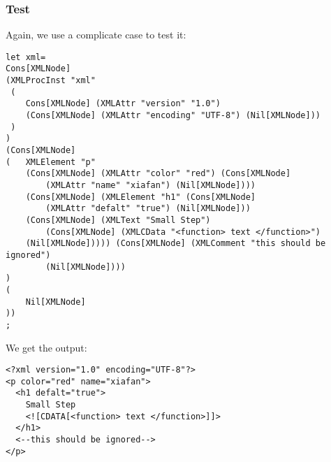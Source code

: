 \subsubsection{Test}
Again, we use a complicate case to test it:

\begin{lstlisting}
let xml=
Cons[XMLNode]
(XMLProcInst "xml"
 (
    Cons[XMLNode] (XMLAttr "version" "1.0")
    (Cons[XMLNode] (XMLAttr "encoding" "UTF-8") (Nil[XMLNode]))
 )
)
(Cons[XMLNode]
(   XMLElement "p"
    (Cons[XMLNode] (XMLAttr "color" "red") (Cons[XMLNode]
        (XMLAttr "name" "xiafan") (Nil[XMLNode])))
    (Cons[XMLNode] (XMLElement "h1" (Cons[XMLNode]
        (XMLAttr "defalt" "true") (Nil[XMLNode]))
    (Cons[XMLNode] (XMLText "Small Step")
        (Cons[XMLNode] (XMLCData "<function> text </function>")
    (Nil[XMLNode])))) (Cons[XMLNode] (XMLComment "this should be ignored")
        (Nil[XMLNode])))
)
(
    Nil[XMLNode]
))
;
\end{lstlisting}

We get the output:

\begin{lstlisting}
<?xml version="1.0" encoding="UTF-8"?>
<p color="red" name="xiafan">
  <h1 defalt="true">
    Small Step
    <![CDATA[<function> text </function>]]>
  </h1>
  <--this should be ignored-->
</p>
\end{lstlisting}

